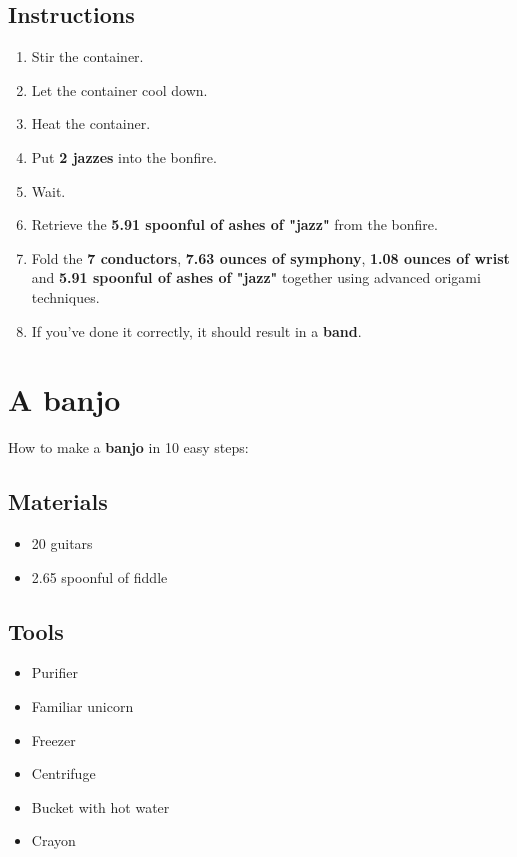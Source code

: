 \documentclass{article}
\begin{document}
\subsection{Instructions}\begin{enumerate}
\item 
Stir the container.
\item 
Let the container cool down.
\item 
Heat the container.
\item 
Put \textbf{2 jazzes} into the bonfire.
\item 
Wait.
\item 
Retrieve the \textbf{5.91 spoonful of ashes of "jazz"} from the bonfire.
\item 
Fold the \textbf{7 conductors}, \textbf{7.63 ounces of symphony}, \textbf{1.08 ounces of wrist} and \textbf{5.91 spoonful of ashes of "jazz"} together using advanced origami techniques.
\item 
If you've done it correctly, it should result in a \textbf{band}.
\end{enumerate}
\newpage
\section{A banjo}How to make a \textbf{banjo} in 10 easy steps:

\subsection{Materials}\begin{itemize}
\item 
20 guitars
\item 
2.65 spoonful of fiddle
\end{itemize}
\subsection{Tools}\begin{itemize}
\item 
Purifier
\item 
Familiar unicorn
\item 
Freezer
\item 
Centrifuge
\item 
Bucket with hot water
\item 
Crayon
\end{itemize}
\end{document}
